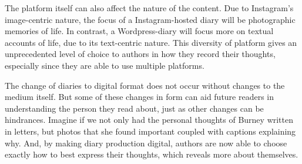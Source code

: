 \documentclass[12pt]{article}[titlepage]
\newcommand{\1}{\={a}}
\newcommand{\2}{\={e}}
\newcommand{\3}{\={\i}}
\newcommand{\4}{\=o}
\newcommand{\5}{\=u}
\newcommand{\6}{\={A}}
\renewcommand{\,}{\textsuperscript{,}}
\begin{document}
The platform itself can also affect the nature of the content.
Due to Instagram's image-centric nature, the focus of a Instagram-hosted diary will be photographic memories of  life.
In contrast, a Wordpress-diary will focus more on textual accounts of life, due to its text-centric nature.
This diversity of platform gives an unprecedented level of choice to authors in how they record their thoughts, especially since they are able to use multiple platforms.

The change of diaries to digital format does not occur without changes to the medium itself.
But some of these changes in form can aid future readers in understanding the person they read about, just as other changes can be hindrances.
Imagine if we not only had the personal thoughts of Burney written in letters, but photos that she found important coupled with captions explaining why.
And, by making diary production digital, authors are now able to choose exactly how to best express their thoughts, which reveals more about themselves.
\end{document}
